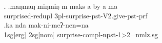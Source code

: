  
\ex. \ag.maŋmaŋ-miŋmiŋ m-maks-a-by-a-ma\\
	surprised{\sc -redupl} {\sc 3pl-}surprise{\sc -pst-V2.give-pst-prf}\\
	 
 	\bg.ka nda mak-ni-meʔ-nen=na\\
	{\sc 1sg[erg]} {\sc 2sg[nom]} surprise{\sc -compl-npst-1>2=nmlz.sg}		\\
	

 
 
 
\newpage
 
